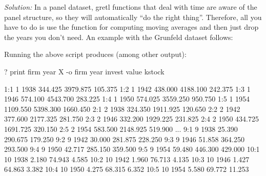 \emph{Solution:} In a panel dataset, gretl functions that deal
with time are aware of the panel structure, so they will automatically
``do the right thing''. Therefore, all you have to do is use the
 function for computing moving averages and then just
drop the years you don't need. An example with the Grunfeld dataset
follows:
Running the above script produces (among other output):
\begin{code}
? print firm year X -o
             firm         year       invest        value       kstock

 1:1            1         1938      344.425     3979.875      105.375
 1:2            1         1942      438.000     4188.100      242.375
 1:3            1         1946      574.100     4543.700      283.225
 1:4            1         1950      574.025     3559.250      950.750
 1:5            1         1954     1109.550     5398.300     1660.450
 2:1            2         1938      324.350     1911.925      120.650
 2:2            2         1942      377.600     2177.325      281.750
 2:3            2         1946      332.200     1929.225      231.825
 2:4            2         1950      434.725     1691.725      320.150
 2:5            2         1954      583.500     2148.925      519.900
...
 9:1            9         1938       25.390      290.675      179.250
 9:2            9         1942       30.000      281.875      228.250
 9:3            9         1946       51.858      364.250      293.500
 9:4            9         1950       42.717      285.150      359.500
 9:5            9         1954       59.480      446.300      429.000
10:1           10         1938        2.180       74.943        4.585
10:2           10         1942        1.960       76.713        4.135
10:3           10         1946        1.427       64.863        3.382
10:4           10         1950        4.275       68.315        6.352
10:5           10         1954        5.580       69.772       11.253
\end{code}

